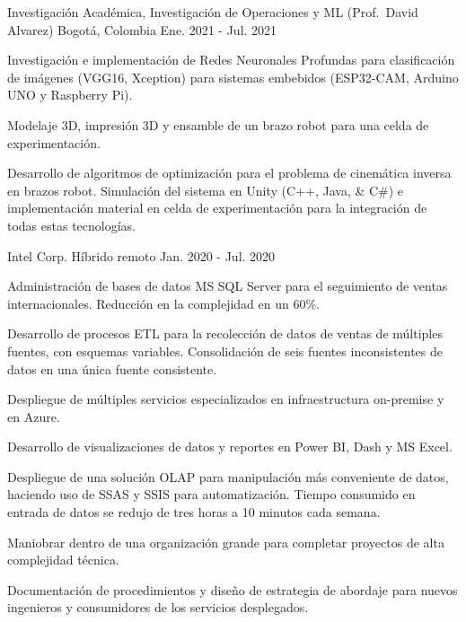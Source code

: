 \begin{cventries}
	{Investigación Académica, Investigación de Operaciones y ML (Prof.\ David Alvarez)}
	{Bogotá, Colombia} %
	{Ene. 2021 {-} Jul. 2021} %
	{
		\begin{cvitems} %
			\item {Investigación e implementación de Redes Neuronales Profundas para clasificación de imágenes (VGG16, Xception) para sistemas embebidos (ESP32-CAM, Arduino UNO y Raspberry Pi).}
			\item {Modelaje 3D, impresión 3D y ensamble de un brazo robot para una celda de experimentación.}
			\item {Desarrollo de algoritmos de optimización para el problema de cinemática inversa en brazos robot. Simulación del sistema en Unity (C++, Java, \& C\#) e implementación material en celda de experimentación para la integración de todas estas tecnologías.}
		\end{cvitems}
	}

	{Intel Corp.} %
	{Híbrido remoto} %
	{Jan. 2020 {-} Jul. 2020} %
	{
		\begin{cvitems}
			\item {Administración de bases de datos MS SQL Server para el seguimiento de ventas internacionales. Reducción en la complejidad en un 60\%.}
			\item {Desarrollo de procesos ETL para la recolección de datos de ventas de múltiples fuentes, con esquemas variables. Consolidación de seis fuentes inconsistentes de datos en una única fuente consistente.}
			\item {Despliegue de múltiples servicios especializados en infraestructura on-premise y en Azure.}
			\item {Desarrollo de visualizaciones de datos y reportes en Power BI, Dash y MS Excel.}
			\item {Despliegue de una solución OLAP para manipulación más conveniente de datos, haciendo uso de SSAS y SSIS para automatización. Tiempo consumido en entrada de datos se redujo de tres horas a 10 minutos cada semana.}
			\item {Maniobrar dentro de una organización grande para completar proyectos de alta complejidad técnica.}
			\item {Documentación de procedimientos y diseño de estrategia de abordaje para nuevos ingenieros y consumidores de los servicios desplegados.}
		\end{cvitems}
	}
\end{cventries}

